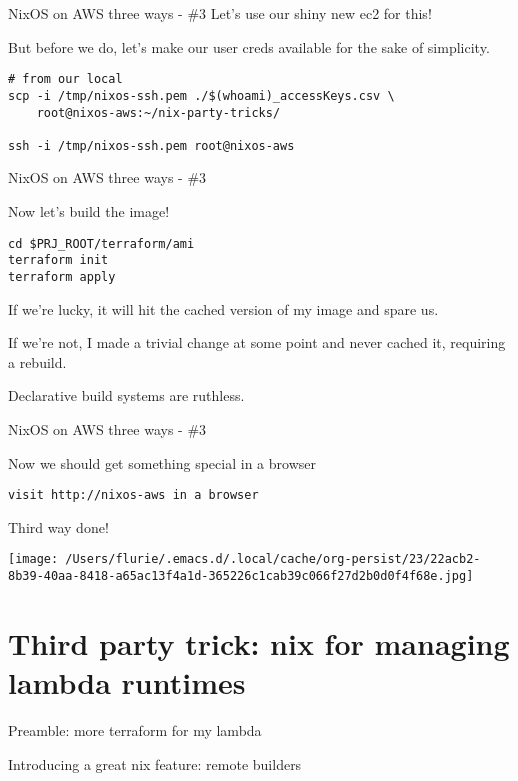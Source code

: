 \documentclass[bigger]{beamer}
\begin{document}
\begin{frame}[label={sec:org7143085},fragile]{NixOS on AWS three ways - \#3}
 Let's use our shiny new ec2  for this!

\begin{exampleblock}{But before we do, let's make our user creds available for the sake of simplicity.}
\tiny
\begin{verbatim}
# from our local
scp -i /tmp/nixos-ssh.pem ./$(whoami)_accessKeys.csv \
    root@nixos-aws:~/nix-party-tricks/

ssh -i /tmp/nixos-ssh.pem root@nixos-aws
\end{verbatim}
\end{exampleblock}
\end{frame}
\begin{frame}[label={sec:orgdbf9819},fragile]{NixOS on AWS three ways - \#3}
 \begin{exampleblock}{Now let's build the image!}
\begin{verbatim}
cd $PRJ_ROOT/terraform/ami
terraform init
terraform apply
\end{verbatim}

If we're lucky, it will hit the cached version of my image and spare us.

If we're not, I made a trivial change at some point and never cached it, requiring a rebuild.

Declarative build systems are ruthless.
\end{exampleblock}
\end{frame}
\begin{frame}[label={sec:org8712c30},fragile]{NixOS on AWS three ways - \#3}
 \begin{exampleblock}{Now we should get something special in a browser}
\begin{verbatim}
visit http://nixos-aws in a browser
\end{verbatim}

Third way done!
\begin{center}
\texttt{[image: /Users/flurie/.emacs.d/.local/cache/org-persist/23/22acb2-8b39-40aa-8418-a65ac13f4a1d-365226c1cab39c066f27d2b0d0f4f68e.jpg]}
\end{center}
\end{exampleblock}
\end{frame}

\section{Third party trick: nix for managing lambda runtimes}
\label{sec:orgc00200c}
\begin{frame}[label={sec:org803d92a}]{Preamble: more terraform for my lambda}
\end{frame}
\begin{frame}[label={sec:org1b34b6d}]{Introducing a great nix feature: remote builders}
\end{frame}
\end{document}
